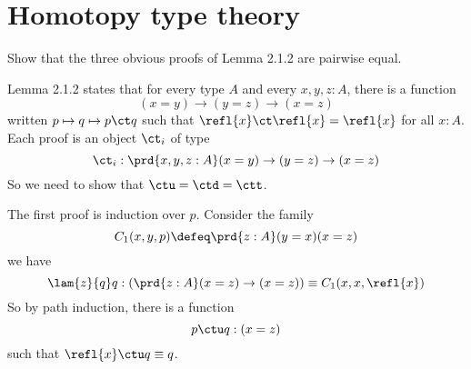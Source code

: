 \begin{coqdoccode}
\end{coqdoccode}
\section{Homotopy type theory}



Show that the three obvious proofs of Lemma 2.1.2 are pairwise equal.
 

 \soln
Lemma 2.1.2 states that for every type $A$ and every $x, y, z : A$, there is a
function
\[
  (x = y) \to (y = z) \to (x = z)
\]
written $p \mapsto q \mapsto p \ct q$ such that $\refl{x} \ct \refl{x} =
\refl{x}$ for all $x : A$.  Each proof is an object $\ct_{i}$ of type
\[
  \ct_{i} : \prd{x,y,z:A} (x=y)\to(y=z)\to(x=z)
\]
So we need to show that $\ctu = \ctd = \ctt$.


The first proof is induction over $p$.  Consider the family
\[
  C_{1}(x, y, p) \defeq 
  \prd{z:A} (y=x) (x=z)
\]
we have
\[
\lam{z}{q}q :
\left(\prd{z:A} (x=z) \to (x=z)\right)
  \equiv
  C_{1}(x, x, \refl{x})
\]
So by path induction, there is a function
\[
  p \ctu q : (x=z)
\]
such that $\refl{x} \ctu q \equiv q$. 


